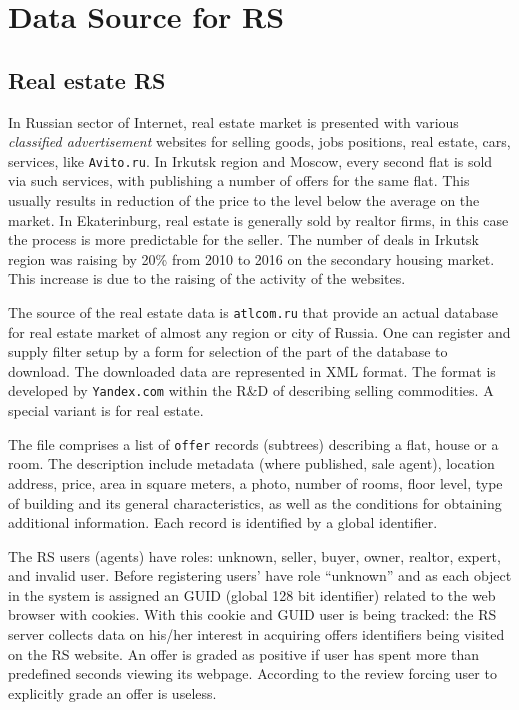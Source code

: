 \documentclass[conference,a4]{IEEEtran}
\begin{document}
\section{Data Source for RS}

\subsection{Real estate RS}

In Russian sector of Internet, real estate market is presented with various \emph{classified advertisement} websites for selling goods, jobs positions, real estate, cars, services, like \texttt{Avito.ru}.  In Irkutsk region and Moscow, every second flat is sold via such services, with publishing a number of offers for the same flat.  This usually results in reduction of the price to the level below the average on the market.  In Ekaterinburg, real estate is generally sold by realtor firms, in this case the process is more predictable for the seller.  The number of deals in Irkutsk region was raising by 20\% from 2010 to 2016 on the secondary housing market.  This increase is due to the raising of the activity of the websites.

The source of the real estate data is \texttt{atlcom.ru} that provide an actual database for real estate market of almost any region or city of Russia.  One can register and supply filter setup by a form for selection of the part of the database to download. The downloaded data are represented in XML format.  The format is developed by \texttt{Yandex.com} within the R\&D of describing selling commodities.  A special variant is for real estate.

The file comprises a list of \texttt{offer} records (subtrees) describing a flat, house or a room.  The description include metadata (where published, sale agent), location address, price, area in square meters, a photo, number of rooms, floor level, type of building and its general characteristics, as well as the conditions for obtaining additional information.  Each record is identified by a global identifier.

The RS users (agents) have roles: unknown, seller, buyer, owner, realtor, expert, and invalid user.  Before registering users' have role ``unknown'' and as each object in the system is assigned an GUID (global 128 bit identifier) related to the web browser with cookies.  With this cookie and GUID user is being tracked: the RS server collects data on his/her interest in acquiring offers identifiers being visited on the RS website.  An offer is graded as positive if user has spent more than predefined seconds viewing its webpage.  According to the review \cite{br13} forcing user to explicitly grade an offer is useless.
\end{document}
